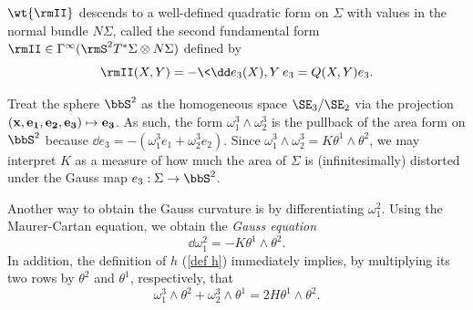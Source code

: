 \begin{defn}
    $\wt{\rmII}$ descends to a well-defined quadratic form on $\Sigma$ with values in the normal bundle $N\Sigma$, called the second fundamental form $\rmII\in\Gamma^\infty(\rmS^2T^\ast\Sigma\otimes N\Sigma)$ defined by
    \[\rmII(X,Y)=-\<\dd e_3(X),Y\>e_3=Q(X,Y)e_3.\]
\end{defn}

\begin{rem}
    Treat the sphere $\bbS^2$ as the homogeneous space $\SE_3\slash\SE_2$ via the projection $(\bf{x},e_1,e_2,e_3)\mapsto e_3$. As such, the form $\omega_1^3\wedge\omega_2^3$ is the pullback of the area form on $\bbS^2$ because $\dd e_3=-(\omega_1^3 e_1+\omega_2^3 e_2)$. Since $\omega_1^3\wedge\omega_2^3=K\theta^1\wedge\theta^2$, we may interpret $K$ as a measure of how much the area of $\Sigma$ is (infinitesimally) distorted under the Gauss map $e_3:\Sigma\to \bbS^2$.
\end{rem}

Another way to obtain the Gauss curvature is by differentiating $\omega_1^2$. Using the Maurer-Cartan equation, we obtain the \emph{Gauss equation}
\[\dd\omega_1^2=-K\theta^1\wedge\theta^2.\label{eq 2.14 Ivey}\]
In addition, the definition of $h$ (\ref{def h}) immediately implies, by multiplying its two rows by $\theta^2$ and $\theta^1$, respectively, that
\[\omega_1^3\wedge\theta^2+\omega_2^3\wedge\theta^1=2H\theta^1\wedge\theta^2.\]

